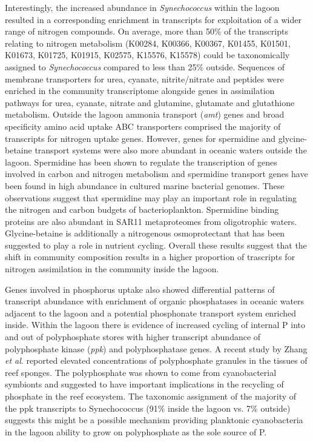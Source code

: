 Interestingly, the increased abundance in {\em Synechococcus} within the lagoon resulted in a corresponding enrichment in transcripts for exploitation of a wider range of nitrogen compounds. On average, more than 50\% of the transcripts relating to nitrogen metabolism (K00284, K00366, K00367, K01455, K01501, K01673, K01725, K01915, K02575, K15576, K15578) could be taxonomically assigned to {\em Synechococcus} compared to less than 25\% outside. Sequences of membrane transporters for urea, cyanate, nitrite/nitrate and peptides were enriched in the community transcriptome alongside genes in assimilation pathways for urea, cyanate, nitrate and glutamine, glutamate and glutathione metabolism. Outside the lagoon ammonia transport ({\em amt}) genes and broad specificity amino acid uptake ABC transporters comprised the majority of transcripts for nitrogen uptake genes. However, genes for spermidine and glycine-betaine transport systems were also more abundant in oceanic waters outside the lagoon. Spermidine has been shown to regulate the transcription of genes involved in carbon and nitrogen metabolism \cite{mou_genes_2010} and spermidine transport genes have been found in high abundance in cultured marine bacterial genomes. These observations suggest that spermidine may play an important role in regulating the nitrogen and carbon budgets of bacterioplankton. Spermidine binding proteins are also abundant in SAR11 metaproteomes from oligotrophic waters. \cite{sowell_transport_2009} Glycine-betaine is additionally a nitrogenous osmoprotectant \cite{oren_microbial_2008} that has been suggested to play a role in nutrient cycling. \cite{jeffries_increases_2012} Overall these results suggest that the shift in community composition results in a higher proportion of trascripts for nitrogen assimilation in the community inside the lagoon.

Genes involved in phosphorus uptake also showed differential patterns of transcript abundance with enrichment of organic phosphatases in oceanic waters adjacent to the lagoon and a potential phosphonate transport system enriched inside. Within the lagoon there is evidence of increased cycling of internal P into and out of polyphosphate stores with higher transcript abundance of polyphosphate kinase ({\em ppk}) and polyphosphatase genes. A recent study by Zhang {\em et al}. \cite{zhang_phosphorus_2015} reported elevated concentrations of polyphosphate granules in the tissues of reef sponges. The polyphosphate was shown to come from cyanobacterial symbionts and suggested to have important implications in the recycling of phosphate in the reef ecosystem. The taxonomic assignment of the majority of the ppk transcripts to Synechococcus (91\% inside the lagoon vs. 7\% outside) suggests this might be a possible mechanism providing planktonic cyanobacteria in the lagoon ability to grow on polyphosphate as the sole source of P. \cite{mazard2012dissecting}

